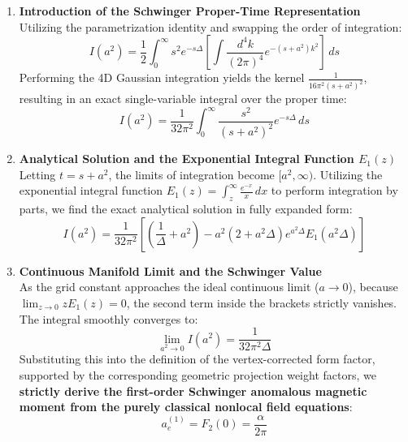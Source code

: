 \documentclass[12pt, a4paper]{article}
\begin{document}
\begin{enumerate}
    \item \textbf{Introduction of the Schwinger Proper-Time Representation} \\
    Utilizing the parametrization identity and swapping the order of integration:
    \begin{equation}
    I(a^2) = \frac{1}{2} \int_0^\infty s^2 e^{-s \Delta} \left[ \int \frac{d^4k}{(2\pi)^4} e^{-(s + a^2) k^2} \right] \, ds
    \end{equation}
    Performing the 4D Gaussian integration yields the kernel $\frac{1}{16\pi^2 (s + a^2)^2}$, resulting in an exact single-variable integral over the proper time:
    \begin{equation}
    I(a^2) = \frac{1}{32\pi^2} \int_0^\infty \frac{s^2}{(s + a^2)^2} e^{-s \Delta} \, ds
    \end{equation}
    
    \item \textbf{Analytical Solution and the Exponential Integral Function $E_1(z)$} \\
    Letting $t = s + a^2$, the limits of integration become $[a^2, \infty)$. Utilizing the exponential integral function $E_1(z) = \int_z^\infty \frac{e^{-x}}{x} \, dx$ to perform integration by parts, we find the exact analytical solution in fully expanded form:
    \begin{equation}
    I(a^2) = \frac{1}{32\pi^2} \left[ \left( \frac{1}{\Delta} + a^2 \right) - a^2 (2 + a^2 \Delta) e^{a^2\Delta} E_1(a^2\Delta) \right]
    \end{equation}
    
    \item \textbf{Continuous Manifold Limit and the Schwinger Value} \\
    As the grid constant approaches the ideal continuous limit ($a \to 0$), because $\lim_{z\to 0} z E_1(z) = 0$, the second term inside the brackets strictly vanishes. The integral smoothly converges to:
    \begin{equation}
    \lim_{a^2 \to 0} I(a^2) = \frac{1}{32\pi^2 \Delta}
    \end{equation}
    Substituting this into the definition of the vertex-corrected form factor, supported by the corresponding geometric projection weight factors, we \textbf{strictly derive the first-order Schwinger anomalous magnetic moment from the purely classical nonlocal field equations}:
    \begin{equation}
    a_e^{(1)} = F_2(0) = \frac{\alpha}{2\pi}
    \end{equation}
\end{enumerate}
\end{document}

